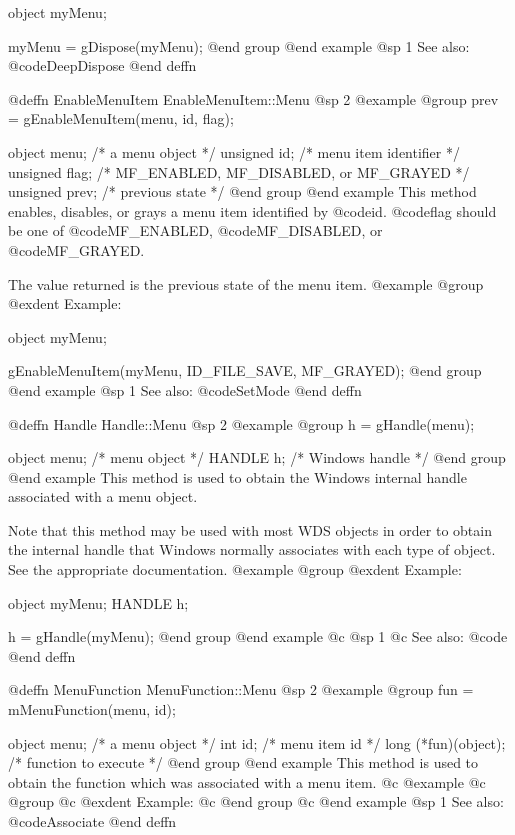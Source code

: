 object  myMenu;

myMenu = gDispose(myMenu);
@end group
@end example
@sp 1
See also:  @code{DeepDispose}
@end deffn




@deffn {EnableMenuItem} EnableMenuItem::Menu
@sp 2
@example
@group
prev = gEnableMenuItem(menu, id, flag);

object    menu;   /*  a menu object        */
unsigned  id;     /*  menu item identifier  */
unsigned  flag;   /*  MF_ENABLED, MF_DISABLED, or MF_GRAYED  */
unsigned  prev;   /*  previous state       */
@end group
@end example
This method enables, disables, or grays a menu item identified by
@code{id}.  @code{flag} should be one of @code{MF_ENABLED},
@code{MF_DISABLED}, or @code{MF_GRAYED}.

The value returned is the previous state of the menu item.
@example
@group
@exdent Example:

object  myMenu;

gEnableMenuItem(myMenu, ID_FILE_SAVE, MF_GRAYED);
@end group
@end example
@sp 1
See also:  @code{SetMode}
@end deffn












@deffn {Handle} Handle::Menu
@sp 2
@example
@group
h = gHandle(menu);

object  menu;   /*  menu object    */
HANDLE  h;      /*  Windows handle */
@end group
@end example
This method is used to obtain the Windows internal handle associated with
a menu object.  

Note that this method may be used with most WDS objects in order to obtain
the internal handle that Windows normally associates with each type of object.
See the appropriate documentation.
@example
@group
@exdent Example:

object  myMenu;
HANDLE  h;

h = gHandle(myMenu);
@end group
@end example
@c @sp 1
@c See also:  @code{}
@end deffn









@deffn {MenuFunction} MenuFunction::Menu
@sp 2
@example
@group
fun = mMenuFunction(menu, id);

object  menu;   /*  a menu object     */
int     id;     /*  menu item id      */
long    (*fun)(object);  /*  function to execute  */
@end group
@end example
This method is used to obtain the function which was associated with a
menu item.
@c @example
@c @group
@c @exdent Example:
@c @end group
@c @end example
@sp 1
See also:  @code{Associate}
@end deffn







